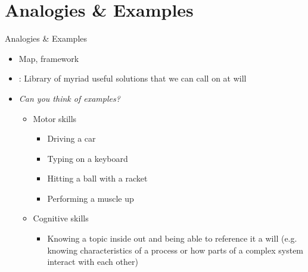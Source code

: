 \documentclass{ercisbeamer}
\begin{document}
\section{Analogies \& Examples}
\begin{frame}{Analogies \& Examples}
    \begin{tbox}
        \begin{itemize}
            \item Map, framework
            \item {}: Library of myriad useful solutions that we can call on at will
        \end{itemize}
    \end{tbox}

    \vspace{.5em}

    \begin{tbox}
        \begin{itemize}
            \item \emph{Can you think of examples?} \pause
            \begin{itemize}
                \item Motor skills
                \begin{itemize}
                    \item Driving a car
                    \item Typing on a keyboard
                    \item Hitting a ball with a racket
                    \item Performing a muscle up
                \end{itemize}
                \item Cognitive skills
                \begin{itemize}
                    \item Knowing a topic inside out and being able to reference it a will (e.g. knowing characteristics of a process or how parts of a complex system interact with each other)
                \end{itemize}
            \end{itemize}
        \end{itemize}    
    \end{tbox}

\end{frame}


\end{document}
